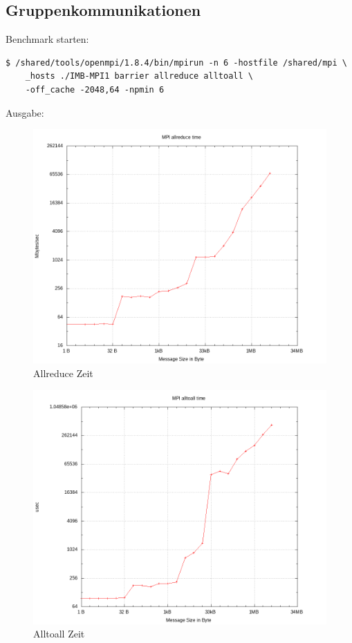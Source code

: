 \subsection{Gruppenkommunikationen}
Benchmark starten:
\begin{lstlisting}[style=Bash]
$ /shared/tools/openmpi/1.8.4/bin/mpirun -n 6 -hostfile /shared/mpi \
    _hosts ./IMB-MPI1 barrier allreduce alltoall \
	-off_cache -2048,64 -npmin 6
\end{lstlisting}
Ausgabe:

\begin{figure}[H]
	\centering
	\includegraphics[scale=0.65]{../mpi_benchmark/allreduce_time.png}
	\caption{Allreduce Zeit}
\end{figure}
\begin{figure}[H]
	\centering
	\includegraphics[scale=0.65]{../mpi_benchmark/alltoall_time.png}
	\caption{Alltoall Zeit}
\end{figure}
\newpage
